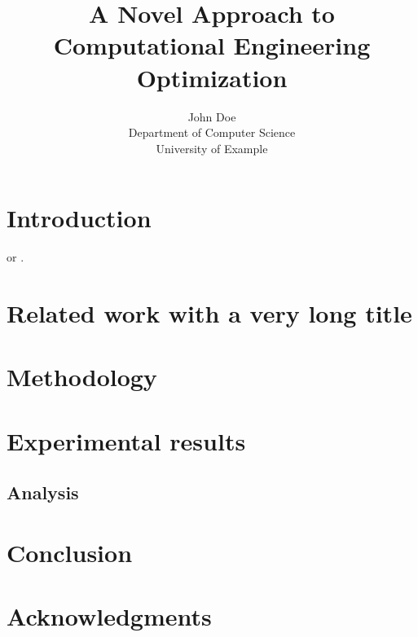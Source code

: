 \documentclass[10pt, twocolumn]{article}
\date{}
\title{A Novel Approach to Computational Engineering Optimization}
\author{John Doe \\ Department of Computer Science \\ University of Example}
\begin{document}
\onecolumn
\maketitle

\thispagestyle{fancy}

\begin{abstract}
\lipsum[1]
\end{abstract}

\twocolumn

\section{Introduction}
\lipsum[2]
\cite{example2023} or \cite{example2024}.

\lipsum[3]

\section{Related work with a very long title}
\lipsum[4-5]

\section{Methodology}
\lipsum[6-7]


\section{Experimental results}
\lipsum[10-11]

\subsection{Analysis}
\lipsum[12]

\section*{Conclusion}
\lipsum[15]

\section*{Acknowledgments}
\lipsum[1][1-3]


\end{document}
